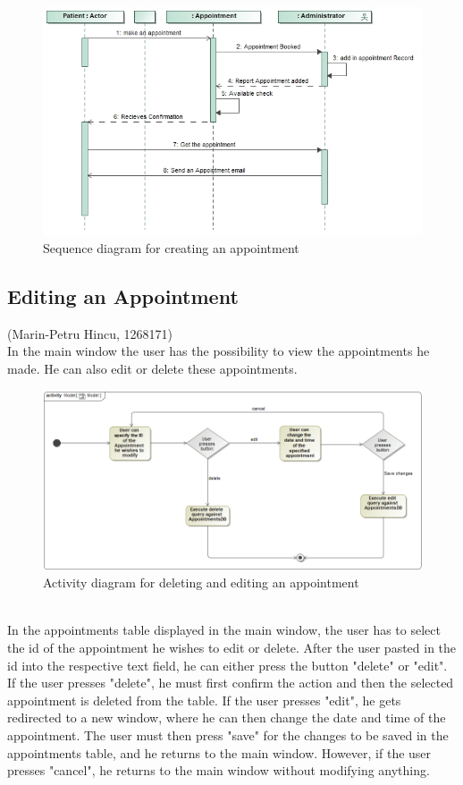 \documentclass[a4paper, 12pt]{report}
\begin{document}
\begin{figure}[!h]
\includegraphics[width=\linewidth]{sequence_appointments.png}
\caption{Sequence diagram for creating an appointment}
\end{figure}

\subsection{Editing an Appointment}
{\tiny (Marin-Petru Hincu, 1268171)\\}
In the main window the user has the possibility to view the appointments he made. He can also edit or delete these appointments.
\begin{figure}[!h]
\includegraphics[width=\linewidth]{acImg.png} 
\caption{Activity diagram for deleting and editing an appointment}
\end{figure}
\\In the appointments table displayed in the main window, the user has to select the id of the appointment he wishes to edit or delete. After the user pasted in the id into the respective text field, he can either press the button "delete" or "edit". If the user presses "delete", he must first confirm the action and then the selected appointment is deleted from the table. If the user presses "edit", he gets redirected to a new window, where he can then change the date and time of the appointment. The user must then press "save" for the changes to be saved in the appointments table, and he returns to the main window. However, if the user presses "cancel", he returns to the main window without modifying anything.
\end{document}
